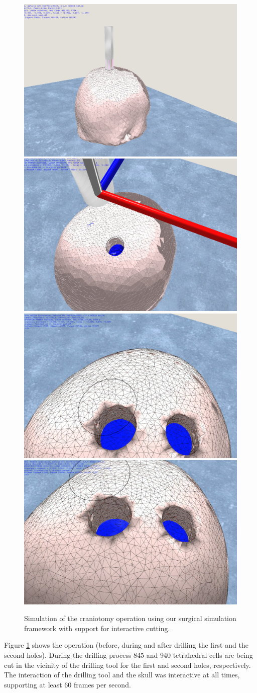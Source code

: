 \begin{figure}[H]
  \centering
  \includegraphics[width=0.4\linewidth]{figures/evaluation/craniotomy06.png}
  \includegraphics[width=0.4\linewidth]{figures/evaluation/craniotomy07.png}
  \includegraphics[width=0.4\linewidth]{figures/evaluation/craniotomy09.png}
  \includegraphics[width=0.4\linewidth]{figures/evaluation/craniotomy10.png}
  \caption{\label{fig:craniotomy}
  {Simulation of the craniotomy operation using our surgical simulation framework with support for interactive cutting.}
}
\end{figure}

Figure \ref{fig:craniotomy} shows the operation (before, during and after drilling the first and the second holes). 
During the drilling process 845 and 940 tetrahedral cells are being cut in the vicinity of the drilling tool 
for the first and second holes, respectively. The interaction of the drilling tool and the skull 
was interactive at all times, supporting at least 60 frames per second.